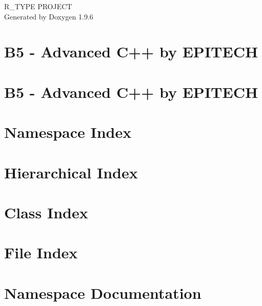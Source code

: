 \documentclass[twoside]{book}
\newcommand{\+}{\discretionary{\mbox{\scriptsize$\hookleftarrow$}}{}{}}
\newcommand{\clearemptydoublepage}{%
    \newpage{\pagestyle{empty}\cleardoublepage}%
  }
\begin{document}
  \raggedbottom
    \hypersetup{pageanchor=false,
                bookmarksnumbered=true,
                pdfencoding=unicode
               }
  \begin{titlepage}
  \vspace*{7cm}
  \begin{center}%
  {\Large R\+\_\+\+TYPE PROJECT}\\
  \vspace*{1cm}
  {\large Generated by Doxygen 1.9.6}\\
  \end{center}
  \end{titlepage}
  \clearemptydoublepage
  \tableofcontents
  \clearemptydoublepage
  \hypersetup{pageanchor=true}
\chapter{B5 -\/ Advanced C++ by EPITECH}
\label{index}\hypertarget{index}{}
\chapter{B5 -\/ Advanced C++ by EPITECH}
\label{md_README}

\chapter{Namespace Index}

\chapter{Hierarchical Index}

\chapter{Class Index}

\chapter{File Index}

\chapter{Namespace Documentation}





\end{document}
